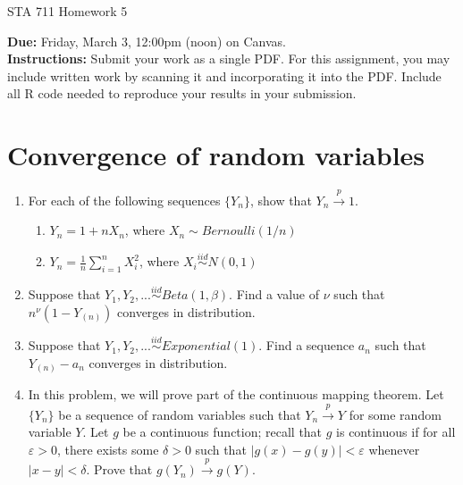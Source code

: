 \documentclass[11pt]{article}
\begin{document}
\begin{center}
\Large
STA 711 Homework 5\\
\normalsize
\vspace{5mm}
\end{center}

\noindent \textbf{Due:} Friday, March 3, 12:00pm (noon) on Canvas.\\ 

\noindent \textbf{Instructions:} Submit your work as a single PDF. For this assignment, you may include written work by scanning it and incorporating it into the PDF. Include all R code needed to reproduce your results in your submission.

\section*{Convergence of random variables}

\begin{enumerate}
\item For each of the following sequences $\{Y_n\}$, show that $Y_n \overset{p}{\to} 1$.
\begin{enumerate}
\item $Y_n = 1 + n X_n$, where $X_n \sim Bernoulli(1/n)$

\item $Y_n = \frac{1}{n} \sum \limits_{i=1}^n X_i^2$, where $X_i \overset{iid}{\sim} N(0, 1)$
\end{enumerate}

\item Suppose that $Y_1, Y_2,... \overset{iid}{\sim} Beta(1, \beta)$. Find a value of $\nu$ such that $n^{\nu}(1 - Y_{(n)})$ converges in distribution.

\item Suppose that $Y_1, Y_2,... \overset{iid}{\sim} Exponential(1)$. Find a sequence $a_n$ such that $Y_{(n)} - a_n$ converges in distribution.

\item In this problem, we will prove part of the continuous mapping theorem. Let $\{Y_n\}$ be a sequence of random variables such that $Y_n \overset{p}{\to} Y$ for some random variable $Y$. Let $g$ be a continuous function; recall that $g$ is continuous if for all $\varepsilon > 0$, there exists some $\delta > 0$ such that $|g(x) - g(y)| < \varepsilon$ whenever $|x - y| < \delta$. Prove that $g(Y_n) \overset{p}{\to} g(Y)$.

\end{enumerate}
\end{document}

